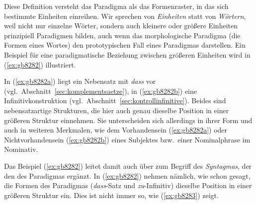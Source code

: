 
Diese Definition versteht das Paradigma als das Formenraster, in das sich bestimmte Einheiten einreihen.
Wir sprechen von \textit{Einheiten} statt von \textit{Wörtern}, weil nicht nur einzelne Wörter, sondern auch kleinere oder größere Einheiten prinzipiell Paradigmen bilden, auch wenn das morphologische Paradigma (die Formen eines Wortes) den prototypischen Fall eines Paradigmas darstellen.
Ein Beispiel für eine paradigmatische Beziehung zwischen größeren Einheiten wird in (\ref{ex:gb8282}) illustriert.

\begin{exe}
  \ex\label{ex:gb8282}
  \begin{xlist}
  \end{xlist}
\end{exe}

In (\ref{ex:gb8282a}) liegt ein Nebensatz mit \textit{dass} vor (vgl.\ Abschnitt~\ref{sec:komplementsaetze}), in (\ref{ex:gb8282b}) eine Infinitivkonstruktion (vgl.\ Abschnitt~\ref{sec:kontrollinfinitive}).
Beides sind nebensatzartige Strukturen, die hier auch genau dieselbe Position in einer größeren Struktur einnehmen.
Sie unterscheiden sich allerdings in ihrer Form und auch in weiteren Merkmalen, wie \zB dem Vorhandensein (\ref{ex:gb8282a}) oder Nichtvorhandensein (\ref{ex:gb8282b}) eines Subjektes bzw.\ einer Nominalphrase im Nominativ.

Das Beispiel (\ref{ex:gb8282}) leitet damit auch über zum Begriff des \textit{Syntagmas}, der den des Paradigmas ergänzt.
In (\ref{ex:gb8282}) nehmen nämlich, wie schon gesagt, die Formen des Paradigmas (\textit{dass}-Satz und \textit{zu}-Infinitiv) dieselbe Position in einer größeren Struktur ein.
Dies ist nicht immer so, wie (\ref{ex:gb8283}) zeigt.

\begin{exe}
  \ex\label{ex:gb8283} 
  \begin{xlist}
  \end{xlist}
\end{exe}

